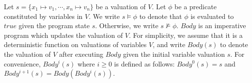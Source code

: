 Let $s = \{ x_1 \mapsto v_1, \cdots, x_n \mapsto v_n \}$ be a valuation of $V$. Let $\phi$ be a predicate constituted by variables in $V$. We write $s \models \phi$ to denote that $\phi$ is evaluated to $true$ given the program state $s$. Otherwise, we write $s \not \models \phi$.
$Body$ is an imperative program which updates the valuation of $V$. For simplicity, we assume that it is a deterministic function on valuations of variables $V$, and write $Body(s)$ to denote the valuation of $V$ after executing $Body$ given the initial variable valuation $s$. For convenience, $Body^i(s)$ where $i \geq 0$ is defined as follows: $Body^0(s) = s$ and $Body^{i+1}(s) = Body(Body^i(s))$.

